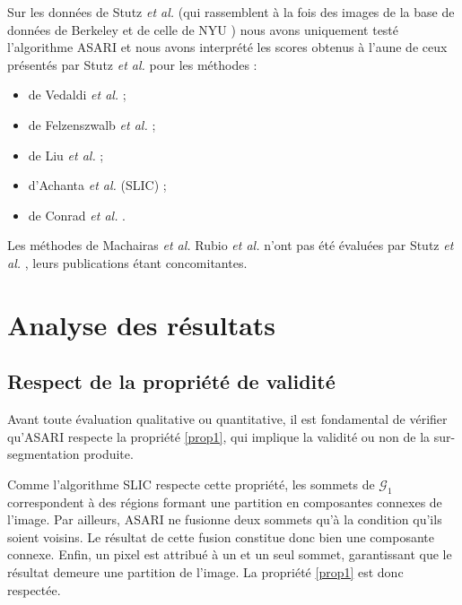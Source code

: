 Sur les données de Stutz \textit{et al.} \cite{stutz2015superpixel} (qui rassemblent à la fois des images de la base de données de Berkeley \cite{MartinFTM01} et de celle de NYU \cite{silberman2012indoor}) nous avons uniquement testé l'algorithme ASARI et nous avons interprété les scores obtenus à l'aune de ceux présentés par Stutz \textit{et al.} \cite{stutz2015superpixel} pour les méthodes :

\begin{itemize}
\item de Vedaldi \textit{et al.} \cite{vedaldi2008quick} ;
\item de Felzenszwalb \textit{et al.} \cite{felzenszwalb2004efficient} ;
\item de Liu \textit{et al.} \cite{liu2011entropy} ;
\item d'Achanta \textit{et al.} (SLIC) \cite{achanta2012slic} ;
\item de Conrad \textit{et al.}  \cite{conrad2013contour}.
\end{itemize} 

Les méthodes de Machairas \textit{et al.} \cite{machairas2015waterpixels}   Rubio \textit{et al.} \cite{rubio2016bass} n'ont pas été évaluées par Stutz \textit{et al.} \cite{stutz2015superpixel}, leurs publications étant concomitantes.

\section{Analyse des résultats}

\subsection{Respect de la propriété de validité}
Avant toute évaluation qualitative ou quantitative, il est fondamental de vérifier qu'ASARI respecte la propriété  \ref{prop1}, qui implique la validité ou non de la sur-segmentation produite. 

Comme l'algorithme SLIC \cite{achanta2012slic} respecte cette propriété, les sommets de $\mathcal{G}_{1}$ correspondent à des régions formant une partition en composantes connexes de l'image. Par ailleurs, ASARI ne fusionne deux sommets qu'à la condition qu'ils soient voisins. Le résultat de cette fusion constitue donc bien une composante connexe. Enfin, un pixel est attribué à un et un seul sommet, garantissant que le résultat demeure une partition de l'image. La propriété \ref{prop1} est donc respectée.

